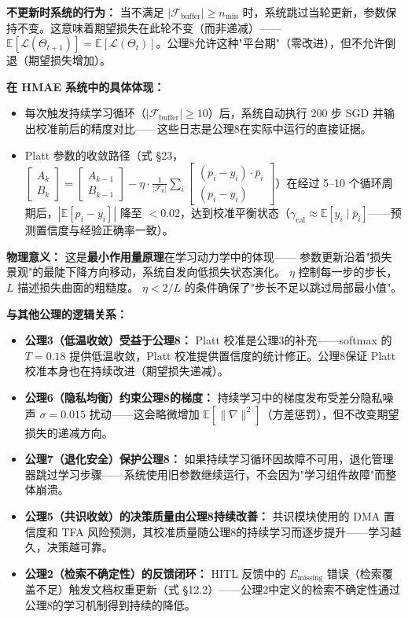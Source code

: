 \documentclass[11pt,a4paper]{ctexart}
\theoremstyle{remark}
\begin{document}
\textbf{不更新时系统的行为：} 当不满足 $|\mathcal{F}_{\text{buffer}}| \geq n_{\min}$ 时，系统跳过当轮更新，参数保持不变。这意味着期望损失在此轮不变（而非递减）——$\mathbb{E}[\mathcal{L}(\Theta_{t+1})] = \mathbb{E}[\mathcal{L}(\Theta_t)]$。公理8允许这种"平台期"（零改进），但不允许倒退（期望损失增加）。

\textbf{在 HMAE 系统中的具体体现：}
\begin{itemize}[nosep]
\item 每次触发持续学习循环（$|\mathcal{F}_{\text{buffer}}| \geq 10$）后，系统自动执行 200 步 SGD 并输出校准前后的精度对比——这些日志是公理8在实际中运行的直接证据。
\item Platt 参数的收敛路径（式 §23，$\begin{bmatrix} A_k \\ B_k \end{bmatrix} = \begin{bmatrix} A_{k-1} \\ B_{k-1} \end{bmatrix} - \eta \cdot \frac{1}{|\mathcal{F}_k|}\sum_i \begin{bmatrix} (p_i - y_i) \cdot \bar{p}_i \\ (p_i - y_i) \end{bmatrix}$）在经过 5--10 个循环周期后，$|\mathbb{E}[p_i - y_i]|$ 降至 $< 0.02$，达到校准平衡状态（$\gamma_{\text{cal}} \approx \mathbb{E}[y_i \mid \bar{p}_i]$——预测置信度与经验正确率一致）。
\end{itemize}

\textbf{物理意义：} 这是\textbf{最小作用量原理}在学习动力学中的体现——
参数更新沿着"损失景观"的最陡下降方向移动，系统自发向低损失状态演化。
$\eta$ 控制每一步的步长，$L$ 描述损失曲面的粗糙度。
$\eta < 2/L$ 的条件确保了"步长不足以跳过局部最小值"。

\textbf{与其他公理的逻辑关系：}
\begin{itemize}[nosep]
\item \textbf{公理3（低温收敛）受益于公理8：} Platt 校准是公理3的补充——softmax 的 $T=0.18$ 提供低温收敛，Platt 校准提供置信度的统计修正。公理8保证 Platt 校准本身也在持续改进（期望损失递减）。
\item \textbf{公理6（隐私均衡）约束公理8的梯度：} 持续学习中的梯度发布受差分隐私噪声 $\sigma=0.015$ 扰动——这会略微增加 $\mathbb{E}[\|\nabla\|^2]$（方差惩罚），但不改变期望损失的递减方向。
\item \textbf{公理7（退化安全）保护公理8：} 如果持续学习循环因故障不可用，退化管理器跳过学习步骤——系统使用旧参数继续运行，不会因为"学习组件故障"而整体崩溃。
\item \textbf{公理5（共识收敛）的决策质量由公理8持续改善：} 共识模块使用的 DMA 置信度和 TFA 风险预测，其校准质量随公理8的持续学习而逐步提升——学习越久，决策越可靠。
\item \textbf{公理2（检索不确定性）的反馈闭环：} HITL 反馈中的 $E_{\text{missing}}$ 错误（检索覆盖不足）触发文档权重更新（式 §12.2）——公理2中定义的检索不确定性通过公理8的学习机制得到持续的降低。
\end{itemize}
\end{document}
